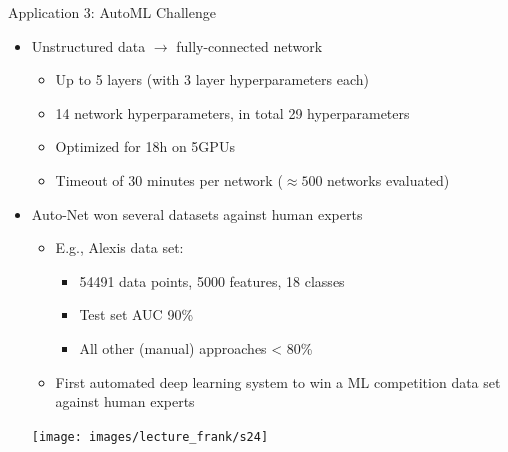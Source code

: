 {
\begin{frame}[c]{Application 3: AutoML Challenge}

\begin{itemize}
	\item Unstructured data $\rightarrow$ fully-connected network
	\begin{itemize}
		\item Up to 5 layers (with 3 layer hyperparameters each)
		\item 14 network hyperparameters, in total \alert{29 hyperparameters}
		\item Optimized for 18h on 5GPUs
		\item Timeout of 30 minutes per network ($\approx500$ networks evaluated)
	\end{itemize}
	\item Auto-Net won several datasets against human experts\\
	\begin{minipage}{0.45\textwidth}
		\begin{itemize}
			\item E.g., Alexis data set:
			\begin{itemize}
				\item 54491 data points,
				5000 features, 18 classes
				\item Test set AUC 90\%
				\item All other (manual)
				approaches < 80\%
			\end{itemize}
		\item \alert{First automated deep learning
		system to win a ML competition
		data set} against human experts
		\end{itemize}
	\end{minipage}
	\begin{minipage}{0.45\textwidth}
		{
			\texttt{[image: images/lecture\_frank/s24]}
		}
	\end{minipage}
\end{itemize}
\end{frame}
}
